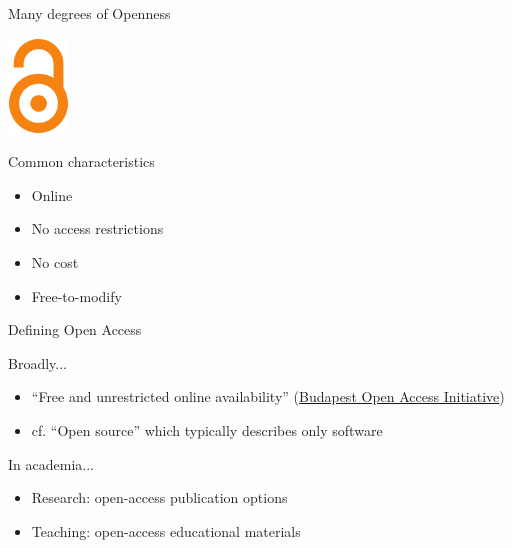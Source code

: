 \begin{frame}{Many degrees of Openness}

\begin{multicols}{2}
\includegraphics[height = 1in]{OAlogo.png}

\columnbreak

\begin{block}{Common characteristics}
\begin{itemize}
        \item Online
\pause
	\item No access restrictions
\pause
	\item No cost
\pause
	\item Free-to-modify
\end{itemize}
\end{block}
\end{multicols}

\end{frame}




\begin{frame}{Defining Open Access}

\begin{block}{Broadly...}
\begin{itemize}
        \item ``Free and unrestricted online availability'' (\href{http://www.budapestopenaccessinitiative.org/read}{Budapest Open Access Initiative})
        \item cf. ``Open source'' which typically describes only software
\end{itemize}
\end{block}

\begin{block}{In academia...}
\begin{itemize}
        \item Research: open-access publication options
        \item Teaching: open-access educational materials
\end{itemize}
\end{block}

\end{frame}

